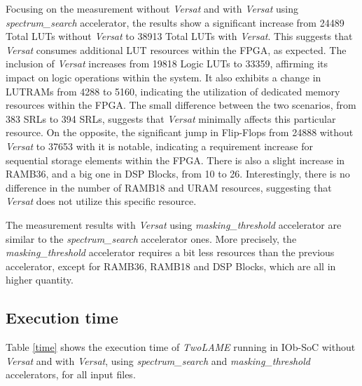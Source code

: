 Focusing on the measurement without \textit{Versat} and with \textit{Versat} using \textit{spectrum\_search} accelerator, the results show a significant increase from 24489 Total LUTs without \textit{Versat} to 38913 Total LUTs with \textit{Versat}. This suggests that \textit{Versat} consumes additional LUT resources within the FPGA, as expected.
The inclusion of \textit{Versat} increases from 19818 Logic LUTs to 33359, affirming its impact on logic operations within the system. It also exhibits a change in LUTRAMs from 4288 to 5160, indicating the utilization of dedicated memory resources within the FPGA.
The small difference between the two scenarios, from 383 SRLs to 394 SRLs, suggests that \textit{Versat} minimally affects this particular resource. On the opposite, the significant jump in Flip-Flops from 24888 without \textit{Versat} to 37653 with it is notable, indicating a requirement increase for sequential storage elements within the FPGA.
There is also a slight increase in RAMB36, and a big one in DSP Blocks, from 10 to 26.
Interestingly, there is no difference in the number of RAMB18 and URAM resources, suggesting that \textit{Versat} does not utilize this specific resource.

The measurement results with \textit{Versat} using \textit{masking\_threshold} accelerator are similar to the \textit{spectrum\_search} accelerator ones. More precisely, the \textit{masking\_threshold} accelerator requires a bit less resources than the previous accelerator, except for RAMB36, RAMB18 and DSP Blocks, which are all in higher quantity.


\subsection{Execution time}

Table \ref{time} shows the execution time of \textit{TwoLAME} running in IOb-SoC without \textit{Versat} and with \textit{Versat}, using \textit{spectrum\_search} and \textit{masking\_threshold} accelerators, for all input files.

\vspace{1cm}

